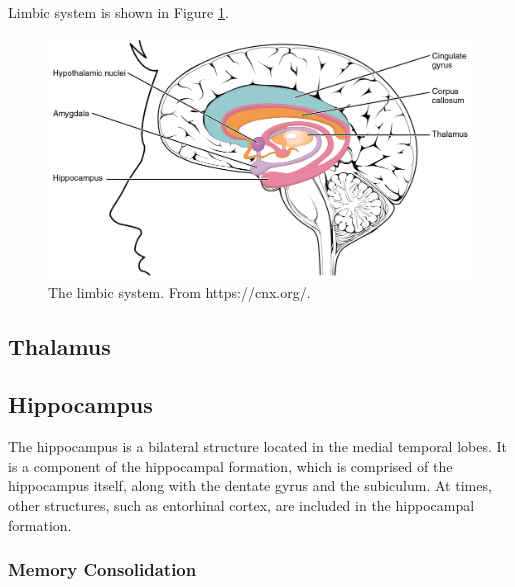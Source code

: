 Limbic system is shown in Figure \ref{fig: limbic system}.

\begin{figure}[h]
    \centering
    \includegraphics[width=.75\textwidth]{images/neuroscience/limbic_system.jpg}
    \caption{The limbic system. From https://cnx.org/.}
    \label{fig: limbic system}
\end{figure}



\subsection{Thalamus}


\subsection{Hippocampus}

The hippocampus is a bilateral structure located in the medial temporal lobes. It is a component of the hippocampal formation, which is comprised of the hippocampus itself, along with the dentate gyrus and the subiculum. At times, other structures, such as entorhinal cortex, are included in the hippocampal formation.


\subsubsection{Memory Consolidation}

